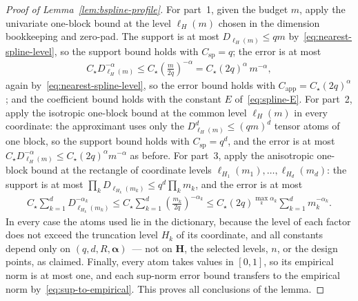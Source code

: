 \begin{proof}[Proof of Lemma~\ref{lem:bspline-profile}]
For part~1, given the budget $m$, apply the univariate one-block bound at the level $\ell_H(m)$ chosen in the dimension bookkeeping and zero-pad. The support is at most $D_{\ell_H(m)}\leq qm$ by~\eqref{eq:nearest-spline-level}, so the support bound holds with $C_{\mathrm{sp}}=q$; the error is at most
\begin{align*}
C_\star D_{\ell_H(m)}^{-\alpha}
\leq C_\star\left(\frac{m}{2q}\right)^{-\alpha}
=C_\star(2q)^{\alpha}\,m^{-\alpha},
\end{align*}
again by~\eqref{eq:nearest-spline-level}, so the error bound holds with $C_{\mathrm{app}}=C_\star(2q)^\alpha$; and the coefficient bound holds with the constant $E$ of~\eqref{eq:spline-E}. For part~2, apply the isotropic one-block bound at the common level $\ell_H(m)$ in every coordinate: the approximant uses only the $D_{\ell_H(m)}^d\leq(qm)^d$ tensor atoms of one block, so the support bound holds with $C_{\mathrm{sp}}=q^d$, and the error is at most $C_\star D_{\ell_H(m)}^{-\alpha}\leq C_\star(2q)^\alpha m^{-\alpha}$ as before. For part~3, apply the anisotropic one-block bound at the rectangle of coordinate levels $\ell_{H_1}(m_1),\ldots,\ell_{H_d}(m_d)$: the support is at most $\prod_kD_{\ell_{H_k}(m_k)}\leq q^d\prod_km_k$, and the error is at most
\begin{align*}
C_\star\sum_{k=1}^dD_{\ell_{H_k}(m_k)}^{-\alpha_k}
\leq C_\star\sum_{k=1}^d\left(\frac{m_k}{2q}\right)^{-\alpha_k}
\leq C_\star(2q)^{\max_k\alpha_k}\sum_{k=1}^dm_k^{-\alpha_k}.
\end{align*}
In every case the atoms used lie in the dictionary, because the level of each factor does not exceed the truncation level $H_k$ of its coordinate, and all constants depend only on $(q,d,R,\boldsymbol\alpha)$~--- not on $\boldsymbol H$, the selected levels, $n$, or the design points, as claimed. Finally, every atom takes values in $[0,1]$, so its empirical norm is at most one, and each sup-norm error bound transfers to the empirical norm by~\eqref{eq:sup-to-empirical}. This proves all conclusions of the lemma.
\end{proof}


